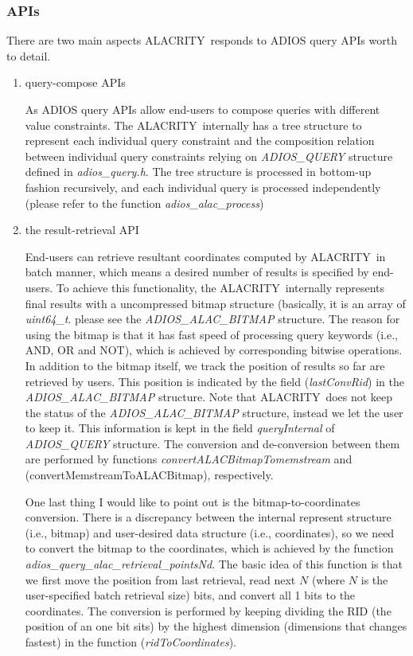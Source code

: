 \documentclass[11pt,a4paper]{article}
\newcommand{\alac}{ALACRITY}
\begin{document}
\subsubsection{APIs}
\label{sec:alac-adios-apis}
There are two main aspects \alac\ responds to ADIOS query APIs worth to detail. 
\begin{enumerate}
\item query-compose APIs

As ADIOS query APIs allow end-users to compose queries with different value constraints. The \alac\ internally has a tree structure to represent each individual query constraint and the composition relation between individual query constraints relying on \emph{ADIOS\_QUERY} structure defined in \emph{adios\_query.h}. 
The tree structure is processed in bottom-up fashion recursively, and each individual query is processed independently (please refer to the function \emph{adios\_alac\_process})

\item the result-retrieval API

End-users can retrieve resultant coordinates computed by \alac\ in batch manner, which means a desired number of results is specified by end-users. 
To achieve this functionality, the \alac\ internally represents final results with a uncompressed bitmap structure (basically, it is an array of \emph{uint64\_t}. please see the \emph{ADIOS\_ALAC\_BITMAP} structure. 
The reason for using the bitmap is that it has fast speed of processing query keywords (i.e., AND, OR and NOT), which is achieved by corresponding bitwise operations. 
In addition to the bitmap itself, we track the position of results so far are retrieved by users. 
This position is indicated by the field (\emph{lastConvRid}) in the \emph{ADIOS\_ALAC\_BITMAP} structure.
Note that \alac\ does not keep the status of the \emph{ADIOS\_ALAC\_BITMAP} structure, instead we let the user to keep it. 
This information is kept in the field \emph{queryInternal} of  \emph{ADIOS\_QUERY} structure.
The conversion and de-conversion between them are performed by functions \emph{convertALACBitmapTomemstream} and  (convertMemstreamToALACBitmap), respectively.

One last thing I would like to point out is the bitmap-to-coordinates conversion. 
There is a discrepancy between the internal represent structure (i.e., bitmap) and user-desired data structure (i.e., coordinates), so we need to convert the bitmap to the coordinates, which is achieved by the function \emph{adios\_query\_alac\_retrieval\_pointsNd}.
The basic idea of this function is that we first move the position from last retrieval, read next $N$ (where $N$ is the user-specified batch retrieval size) bits, and convert all 1 bits to the coordinates. 
The conversion is performed by keeping dividing the RID (the position of an one bit sits) by the highest dimension (dimensions that changes fastest) in the function (\emph{ridToCoordinates}).

\end{enumerate}
\end{document}
